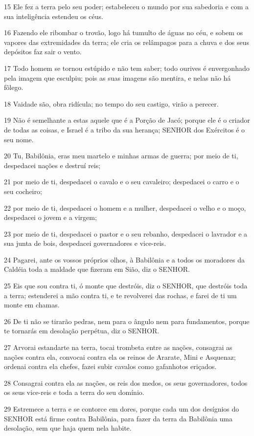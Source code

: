 \par 15 Ele fez a terra pelo seu poder; estabeleceu o mundo por sua sabedoria e com a sua inteligência estendeu os céus.
\par 16 Fazendo ele ribombar o trovão, logo há tumulto de águas no céu, e sobem os vapores das extremidades da terra; ele cria os relâmpagos para a chuva e dos seus depósitos faz sair o vento.
\par 17 Todo homem se tornou estúpido e não tem saber; todo ourives é envergonhado pela imagem que esculpiu; pois as suas imagens são mentira, e nelas não há fôlego.
\par 18 Vaidade são, obra ridícula; no tempo do seu castigo, virão a perecer.
\par 19 Não é semelhante a estas aquele que é a Porção de Jacó; porque ele é o criador de todas as coisas, e Israel é a tribo da sua herança; SENHOR dos Exércitos é o seu nome.
\par 20 Tu, Babilônia, eras meu martelo e minhas armas de guerra; por meio de ti, despedacei nações e destruí reis;
\par 21 por meio de ti, despedacei o cavalo e o seu cavaleiro; despedacei o carro e o seu cocheiro;
\par 22 por meio de ti, despedacei o homem e a mulher, despedacei o velho e o moço, despedacei o jovem e a virgem;
\par 23 por meio de ti, despedacei o pastor e o seu rebanho, despedacei o lavrador e a sua junta de bois, despedacei governadores e vice-reis.
\par 24 Pagarei, ante os vossos próprios olhos, à Babilônia e a todos os moradores da Caldéia toda a maldade que fizeram em Sião, diz o SENHOR.
\par 25 Eis que sou contra ti, ó monte que destróis, diz o SENHOR, que destróis toda a terra; estenderei a mão contra ti, e te revolverei das rochas, e farei de ti um monte em chamas.
\par 26 De ti não se tirarão pedras, nem para o ângulo nem para fundamentos, porque te tornarás em desolação perpétua, diz o SENHOR.
\par 27 Arvorai estandarte na terra, tocai trombeta entre as nações, consagrai as nações contra ela, convocai contra ela os reinos de Ararate, Mini e Asquenaz; ordenai contra ela chefes, fazei subir cavalos como gafanhotos eriçados.
\par 28 Consagrai contra ela as nações, os reis dos medos, os seus governadores, todos os seus vice-reis e toda a terra do seu domínio.
\par 29 Estremece a terra e se contorce em dores, porque cada um dos desígnios do SENHOR está firme contra Babilônia, para fazer da terra da Babilônia uma desolação, sem que haja quem nela habite.
